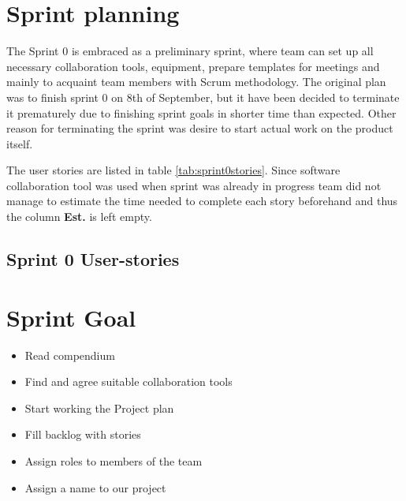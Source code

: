 \section{Sprint planning}
The Sprint 0 is embraced as a preliminary sprint, where team can set up all necessary collaboration tools, equipment, prepare templates for meetings and mainly to acquaint team members with Scrum methodology. The original plan was to finish sprint 0 on 8th of September, but it have been decided to terminate it prematurely due to finishing sprint goals in shorter time than expected. Other reason for terminating the sprint was desire to start actual work on the product itself.

The user stories are listed in table \ref{tab:sprint0stories}. Since software collaboration tool was used when sprint was already in progress team did not manage to estimate the time needed to complete each story beforehand and thus the column \textbf{Est.} is left empty.

\subsection{Sprint 0 User-stories}




\section{Sprint Goal}
\begin{itemize}
    \item Read compendium
    \item Find and agree suitable collaboration tools
    \item Start working the Project plan
    \item Fill backlog with stories
    \item Assign roles to members of the team
    \item Assign a name to our project
\end{itemize}

